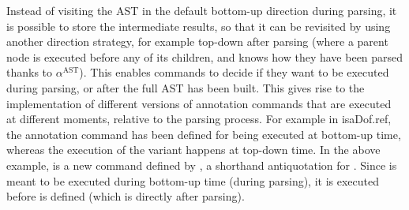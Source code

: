 \begin{isabellebody}
\begin{isamarkuptext}
Instead of visiting the AST in the default bottom-up direction during parsing, it is possible to
store the intermediate results, so that it can be revisited by using another direction strategy, for
example top-down after parsing (where a parent node is executed before any of its children, and
knows how they have been parsed thanks to $\alpha^{\text{AST}}$). This enables commands to decide if
they want to be executed during parsing, or after the full AST has been built. This gives rise to
the implementation of different versions of annotation commands that are executed at different
moments, relative to the parsing process. For example in \csname isaDof.ref, the
annotation command  has been defined for being executed
at bottom-up time, whereas the execution of the variant
 happens at top-down time. In the above example,
 is a new command defined by , a
shorthand antiquotation for . Since
 is meant to be executed during bottom-up time (during parsing), it
is executed before  is defined (which is directly after parsing).


\end{isamarkuptext}
\end{isabellebody}
